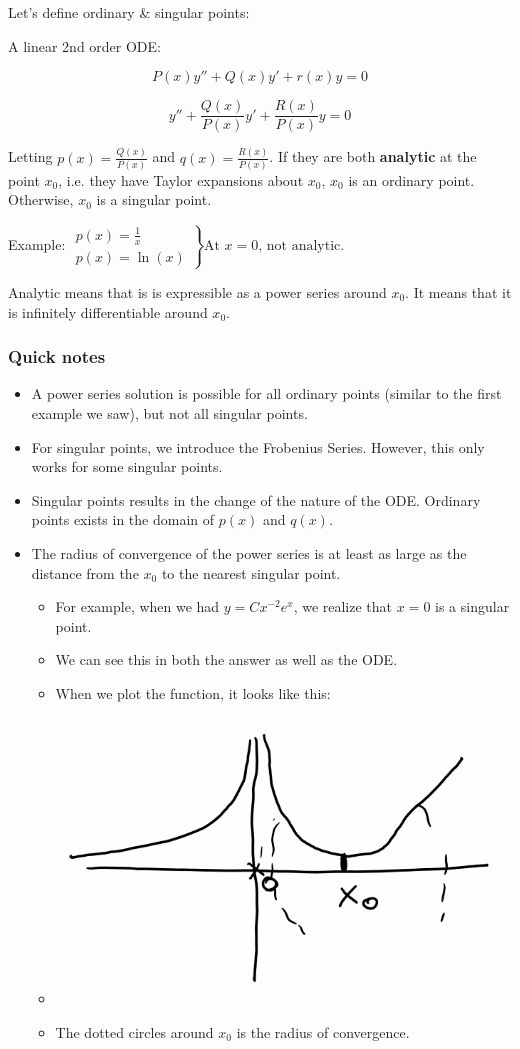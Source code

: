 \documentclass{article}
\begin{document}
Let's define ordinary \& singular points:

A linear 2nd order ODE:

$$P(x) y'' + Q(x) y' + r(x) y = 0$$

$$y'' + \frac{Q(x)}{P(x)} y' + \frac{R(x)}{P(x)} y = 0$$

Letting $p(x) = \frac{Q(x)}{P(x)}$ and $q(x) = \frac{R(x)}{P(x)}$. If they are both \textbf{analytic} at the point $x_0$, i.e. they have Taylor expansions about $x_0$, $x_0$ is an ordinary point. Otherwise, $x_0$ is a singular point. 

Example: $\left. \begin{matrix} p(x) = \frac{1}{x} \\ p(x) = \ln(x) \end{matrix} \right\} \text{At } x = 0 \text{, not analytic}$.

Analytic means that is is expressible as a power series around $x_0$. It means that it is infinitely differentiable around $x_0$. 

\subsubsection{Quick notes}

\begin{itemize}
    \item A power series solution is possible for all ordinary points (similar to the first example we saw), but not all singular points. 
    \item For singular points, we introduce the Frobenius Series. However, this only works for some singular points. 
    \item Singular points results in the change of the nature of the ODE. Ordinary points exists in the domain of $p(x)$ and $q(x)$. 
    \item The radius of convergence of the power series is at least as large as the distance from the $x_0$ to the nearest singular point.
    \begin{itemize}
        \item For example, when we had $y = C x^{-2} e^x$, we realize that $x=  0$ is a singular point. 
        \item We can see this in both the answer as well as the ODE. \item When we plot the function, it looks like this:
        \item \includegraphics[width = 0.5 \textwidth]{image6.png}
        \item The dotted circles around $x_0$ is the radius of convergence. 
    \end{itemize}
\end{itemize}
\end{document}
